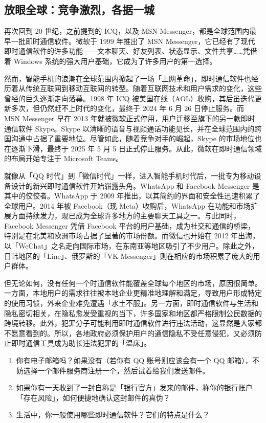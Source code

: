 \subsection{放眼全球：竞争激烈，各据一城}

再次回到 20 世纪，之前提到的 ICQ，以及 MSN Messenger，都是全球范围内最早一批即时通信软件。微软于 1999 年推出了 MSN Messenger，它已经有了现代即时通信软件的许多功能——文本聊天、好友列表、状态显示、文件共享……凭借着 Windows 系统的强大用户基础，它成为了许多用户的第一选择。

然而，智能手机的浪潮在全球范围内掀起了一场「上网革命」，即时通信软件也经历着从传统互联网到移动互联网的转型。随着互联网技术和用户需求的变化，这些曾经的巨头逐渐走向落幕。1998 年 ICQ 被美国在线（AOL）收购，其后虽迭代更新多次，但仍然赶不上时代的变化，最终于 2024 年 6 月 26 日停止服务。而 MSN Messenger 早在 2013 年就被微软正式停用，用户迁移至旗下的另一款即时通信软件 Skype。Skype 以清晰的语音与视频通话功能见长，并在全球范围内的跨国沟通中占据了重要地位。尽管如此，随着竞争对手的崛起，Skype 的市场地位也在逐渐下滑，最终于 2025 年 5 月 5 日正式停止服务。从此，微软在即时通信领域的布局开始专注于 Microsoft Teams。

就像从「QQ 时代」到「微信时代」一样，进入智能手机时代后，一批专为移动设备设计的新兴即时通信软件开始崭露头角。WhatsApp 和 Facebook Messenger 是其中的佼佼者。WhatsApp 于 2009 年推出，以其简约的界面和安全性迅速积累了全球用户。2014 年被 Facebook（现 Meta）收购后，WhatsApp 在功能和市场扩展方面持续发力，现已成为全球许多地方的主要聊天工具之一。与此同时，Facebook Messenger 凭借 Facebook 平台的用户基础，成为社交和通信的桥梁，特别是在北美和欧洲市场占据了显著的市场份额。而微信也开始在 2012 年出海，以「WeChat」之名走向国际市场，在东南亚等地区吸引了不少用户。除此之外，日韩地区的「Line」、俄罗斯的「VK Messenger」则在相应的市场积累了庞大的用户群体。

但无论如何，没有任何一个时通信软件能覆盖全球每个地区的市场，原因很简单。一方面，本地用户的需求往往被本地企业更精准地理解和满足，导致用户形成特定的使用习惯，外来企业难免遭遇「水土不服」。另一方面，即时通信软件与生活和隐私密切相关，在隐私愈发受重视的当下，许多国家和地区都严格限制公民数据的跨境转移。此外，犯罪分子可能利用即时通信软件进行违法活动，这显然是大家都不愿意看到的。所以，各地政府必须保护用户的通信隐私不受任意侵犯，又必须防止即时通信工具成为助长违法犯罪的「温床」。

\practice

\begin{enumerate}
  \item 你有电子邮箱吗？如果没有（若你有 QQ 账号则应该会有一个 QQ 邮箱），不妨选择一个邮件服务商注册一个，然后试着给我们发送邮件。
  \item 如果你有一天收到了一封自称是「银行官方」发来的邮件，称你的银行账户「存在风险」，如何便捷地确认这封邮件的真伪？
  \item 生活中，你一般使用哪些即时通信软件？它们的特点是什么？
\end{enumerate}